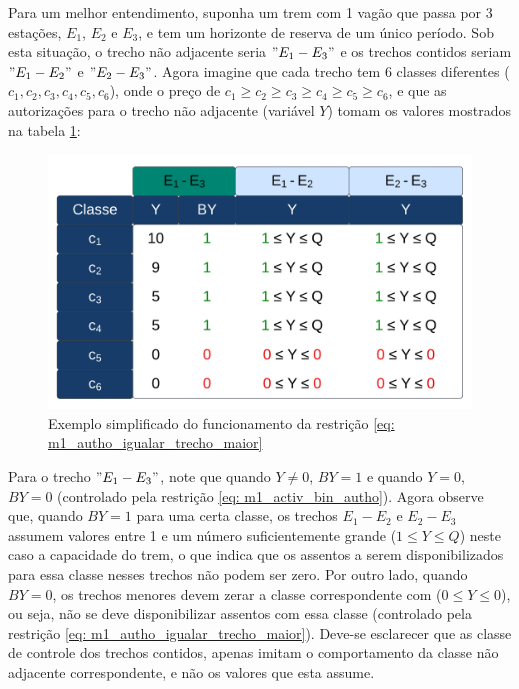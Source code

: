 Para um melhor entendimento, suponha um trem com 1 vagão que passa por 3 estações, $E_1$, $E_2$ e $E_3$, e tem um horizonte de reserva de um único período. Sob esta situação, o trecho não adjacente seria $"E_1-E_3"$ e os trechos contidos seriam $"E_1-E_2"$ e $"E_2-E_3"$. Agora imagine que cada trecho tem 6 classes diferentes ($c_1, c_2, c_3, c_4, c_5, c_6$), onde o preço  de  $c_1 \geq c_2 \geq c_3 \geq c_4 \geq c_5 \geq c_6$, e que as autorizações para o trecho não adjacente (variável $Y$) tomam os valores mostrados na tabela \ref{fig: exemplo_sip}:

\begin{figure}[!ht]
	\begin{center}
		\includegraphics[scale=0.15]{img/tab_trecho_grande.png}
		\caption{Exemplo simplificado do funcionamento da restrição \ref{eq: m1_autho_igualar_trecho_maior}}
		\label{fig: exemplo_sip}
	\end{center}
\end{figure}

Para o trecho $"E_1-E_3"$, note que quando $Y \neq 0$, $BY = 1$ e quando $Y = 0$, $BY = 0$ (controlado pela restrição \ref{eq: m1_activ_bin_autho}). Agora observe que, quando $ BY = 1$ para uma certa classe, os trechos $E_1-E_2$ e $E_2-E_3$ assumem valores entre 1 e um número suficientemente grande ($1 \le Y \leq Q$) neste caso a capacidade do trem, o que indica que os assentos a serem disponibilizados para essa classe nesses trechos não podem ser zero. Por outro lado, quando $BY = 0$, os trechos menores devem zerar a classe correspondente com ($0 \leq Y \leq 0$), ou seja, não se deve disponibilizar assentos com essa classe (controlado pela restrição \ref{eq: m1_autho_igualar_trecho_maior}). Deve-se esclarecer que as classe de controle dos trechos contidos, apenas imitam o comportamento da classe não adjacente correspondente, e não os valores que esta assume.

